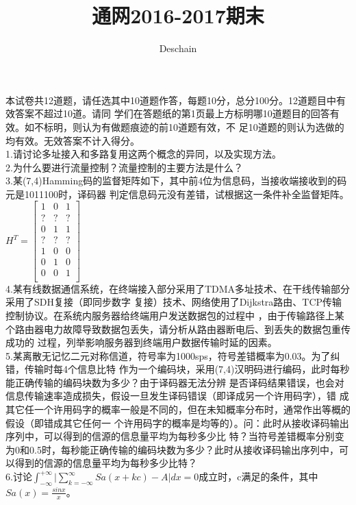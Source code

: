 \documentclass[UTF8]{ctexart}
\title{通网2016-2017期末}
\author{Deschain}
\begin{document}
\maketitle
本试卷共12道题，请任选其中10道题作答，每题10分，总分100分。12道题目中有效答案不超过10道。请同
学们在答题纸的第1页最上方标明哪10道题目的回答有效。如不标明，则认为有做题痕迹的前10道题有效，不
足10道题的则认为选做的均有效。无效答案不计入得分。\\
1.请讨论多址接入和多路复用这两个概念的异同，以及实现方法。\\
2.为什么要进行流量控制？流量控制的主要方法是什么？\\
3.某(7,4)Hamming码的监督矩阵如下，其中前4位为信息码，当接收端接收到的码元是1011100时，译码器
判定信息码元没有差错，试根据这一条件补全监督矩阵。\\
$H^T=\begin{bmatrix}
    1 & 0 & 1 \\
    ? & ? & ? \\
    0 & 1 & 1 \\
    ? & ? & ? \\
    1 & 0 & 0 \\
    0 & 1 & 0 \\
    0 & 0 & 1 \\
  \end{bmatrix} $\\
4.某有线数据通信系统，在终端接入部分采用了TDMA多址技术、在干线传输部分采用了SDH复接（即同步数字
复接）技术、网络使用了Dijkstra路由、TCP传输控制协议。在系统内服务器给终端用户发送数据包的过程中
，由于传输路径上某个路由器电力故障导致数据包丢失，请分析从路由器断电后、到丢失的数据包重传成功的
过程，列举影响服务器到终端用户数据传输时延的因素。\\
5.某离散无记忆二元对称信道，符号率为1000sps，符号差错概率为0.03。为了纠错，传输时每4个信息比特
作为一个编码块，采用(7,4)汉明码进行编码，此时每秒能正确传输的编码块数为多少？由于译码器无法分辨
是否译码结果错误，也会对信息传输速率造成损失，假设一旦发生译码错误（即译成另一个许用码字），错
成其它任一个许用码字的概率一般是不同的，但在未知概率分布时，通常作出等概的假设（即错成其它任何一
个许用码字的概率是均等的）。问：此时从接收译码输出序列中，可以得到的信源的信息量平均为每秒多少比
特？当符号差错概率分别变为0和0.5时，每秒能正确传输的编码块数为多少？此时从接收译码输出序列中，可
以得到的信源的信息量平均为每秒多少比特？\\
6.讨论$\int_{-\infty}^{+\infty}\lvert\sum\limits_{k=-\infty}^\infty Sa(x+kc)-A\rvert dx
  =0$成立时，c满足的条件，其中$Sa(x)=\frac{sinx}{x}$。\\
\end{document}
